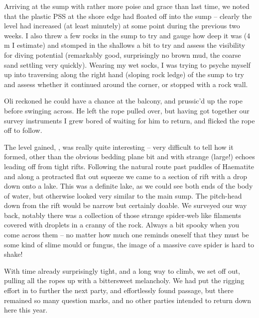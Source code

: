Arriving at the sump with rather more poise and grace than last time, we
noted that the plastic PSS at the shore edge had floated off into the
sump -- clearly the level had increased (at least minutely) at some
point during the previous two weeks. I also threw a few rocks in the
sump to try and gauge how deep it was (4 m I estimate) and stomped in
the shallows a bit to try and assess the visibility for diving potential
(remarkably good, surprisingly no brown mud, the coarse sand settling
very quickly). Wearing my wet socks, I was trying to psyche myself up
into traversing along the right hand (sloping rock ledge) of the sump to
try and assess whether it continued around the corner, or stopped with a
rock wall.


Oli reckoned he could have a chance at the balcony, and prussic'd up the
rope before swinging across. He left the rope pulled over, but having
got together our survey instruments I grew bored of waiting for him to
return, and flicked the rope off to follow.

The level gained, , was really quite interesting -- very
difficult to tell how it formed, other than the obvious bedding plane
bit and with strange (large!) echoes leading off from tight rifts.
Following the natural route past puddles of Haematite and along a
protracted flat out squeeze we came to a section of rift with a drop
down onto a lake. This was a definite lake, as we could see both ends of
the body of water, but otherwise looked very similar to the main sump.
The pitch-head down from the rift would be narrow but certainly doable.
We surveyed our way back, notably there was a collection of those
strange spider-web like filaments covered with droplets in a cranny of
the rock. Always a bit spooky when you come across them -- no matter how
much one reminds oneself that they must be some kind of slime mould or
fungus, the image of a massive cave spider is hard to shake!


With time already surprisingly tight, and a long way to climb, we set
off out, pulling all the ropes up with a bittersweet melancholy. We had
put the rigging effort in to further the next party, and effortlessly
found passage, but there remained so many question marks, and no other
parties intended to return down here this year.

